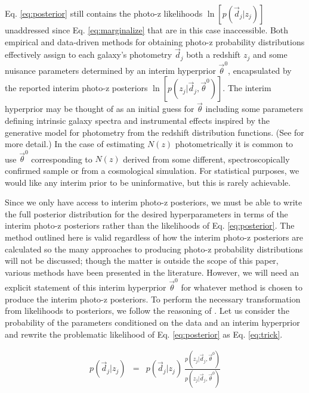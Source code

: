 \documentclass[preprint]{aastex}
\begin{document}
Eq. \ref{eq:posterior} still contains the photo-z likelihoods 
$\ln[p(\vec{d}_{j}|z_{j})]$ unaddressed since Eq. \ref{eq:marginalize} that are 
in this case inaccessible.  Both empirical and data-driven methods for 
obtaining photo-z probability distributions effectively assign to each galaxy's 
photometry $\vec{d}_{j}$ both a redshift $z_{j}$ and some nuisance parameters 
determined by an interim hyperprior $\vec{\theta}^{0}$, encapsulated by the 
reported interim photo-z posteriors 
$\ln[p(z_{j}|\vec{d}_{j},\vec{\theta}^{0})]$.  The interim hyperprior may be 
thought of as an initial guess for $\vec{\theta}$ including some parameters 
defining intrinsic galaxy spectra and instrumental effects inspired by the 
generative model for photometry from the redshift distribution functions. (See 
\citet{Benitez2000} for more detail.)  In the case of estimating $N(z)$ 
photometrically it is common to use $\vec{\theta}^{0}$ corresponding to $N(z)$ 
derived from some different, spectroscopically confirmed sample or from a 
cosmological simulation.  For statistical purposes, we would like any interim 
prior to be uninformative, but this is rarely achievable.  

Since we only have access to interim photo-z posteriors, we must be able to 
write the full posterior distribution for the desired hyperparameters in terms 
of the interim photo-z posteriors rather than the likelihoods of Eq. 
\ref{eq:posterior}.  The method outlined here is valid regardless of how the 
interim photo-z posteriors are calculated so the many approaches to producing 
photo-z probability distributions will not be discussed; though the matter is 
outside the scope of this paper, various methods have been presented in the 
literature. \citep{Sheldon2012, Ball2008, CarrascoKind2013, CarrascoKind2014a}  
However, we will need an explicit statement of this interim hyperprior 
$\vec{\theta}^{0}$ for whatever method is chosen to produce the interim photo-z 
posteriors.  To perform the necessary transformation from likelihoods to 
posteriors, we follow the reasoning of \citet{Marshall2015}.  Let us consider 
the probability of the parameters conditioned on the data and an interim 
hyperprior and rewrite the problematic likelihood of Eq. \ref{eq:posterior} as 
Eq. \ref{eq:trick}.  

\begin{eqnarray}
\label{eq:trick}
p(\vec{d}_{j}|z_{j}) &=& p(\vec{d}_{j}|z_{j})\ 
\frac{p(z_{j}|\vec{d}_{j},\vec{\theta}^{0})}{p(z_{j}|\vec{d}_{j},\vec{\theta}^{0
})}
\end{eqnarray}
\end{document}
